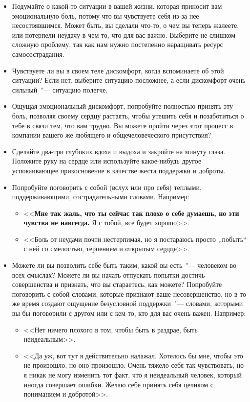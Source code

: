 \begin{itemize}
	\item Подумайте о какой-то ситуации в вашей жизни, которая приносит вам эмоциональную боль, потому что вы чувствуете себя из-за нее несостоявшимся. Может быть, вы сделали что-то, о чем вы теперь жалеете, или потерпели неудачу в чем-то, что для вас важно. Выберите не слишком сложную проблему, так как нам нужно постепенно наращивать ресурс самосострадания.
	
	\item Чувствуете ли вы в своем теле дискомфорт, когда вспоминаете об этой ситуации? Если нет, выберите ситуацию посложнее, а если дискомфорт очень сильный~"--- ситуацию полегче.
	
	\item Ощущая эмоциональный дискомфорт, попробуйте полностью принять эту боль, позволяя своему сердцу растаять, чтобы утешить себя и позаботиться о тебе в связи тем, что вам трудно. Вы можете пройти через этот процесс в компании вашего же любящего и общечеловеческого присутствия?
	
	\item Сделайте два-три глубоких вдоха и выдоха и закройте на минуту глаза. Положите руку на сердце или используйте какое-нибудь другое успокаивающее прикосновение в качестве жеста поддержки и доброты.
	
	\item Попробуйте поговорить с собой (вслух или про себя) теплыми, поддерживающими, сострадательными словами. Например:
	
	\begin{itemize}
		\item <<\textbf{Мне так жаль, что ты сейчас так плохо о себе думаешь, но эти чувства не навсегда.} Я с тобой, все будет хорошо>>.
		
		\item <<Боль от неудачи почти нестерпимая, но я постараюсь просто ,,побыть`` с ней со смелостью, терпением и открытым сердце>>.
	\end{itemize}

	\item Можете ли вы позволить себе быть таким, какой вы есть~"--- человеком во всех смыслах? Можете ли вы начать отпускать попытки достичь совершенства и признать, что вы стараетесь, как можете? Попробуйте поговорить с собой словами, которые признают ваше несовершенство, но в то же время создают ощущение безусловной поддержки~"--- словами, которыми вы бы поговорили с другом или с кем-то, кто для вас очень важен. Например:
	
	\begin{itemize}
		\item <<Нет ничего плохого в том, чтобы быть в раздрае, быть неидеальным>>.
		
		\item <<Да уж, вот тут я действительно налажал. Хотелось бы мне, чтобы это не произошло, но оно произошло. Очень тяжело себя так чувствовать, но я никак не могу изменить тот факт, что я неидеальный человек, который иногда совершает ошибки. Желаю себе принять себя целиком с пониманием и добротой>>.   
	\end{itemize}
\end{itemize}

